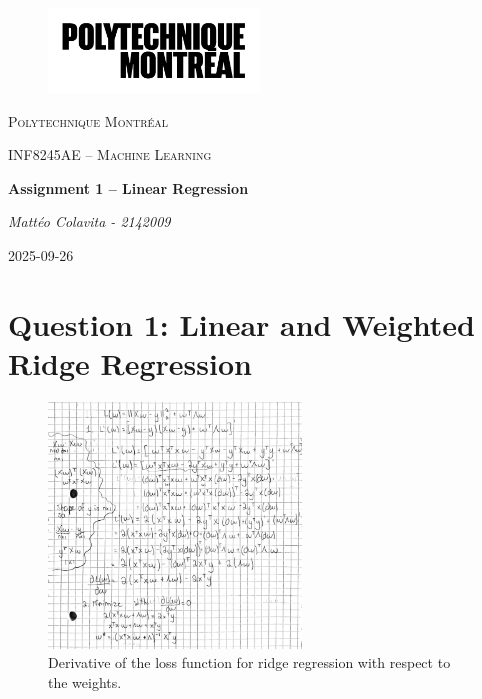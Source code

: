 \documentclass[11pt, a4paper]{article}
\begin{document}
\begin{titlepage}
    \centering
    \begin{figure}[h]
        \centering
        \includegraphics[width=0.5\textwidth]{./assets/logo_polymtl.png}
        \label{fig:logo_polymtl}
    \end{figure}

    {\scshape\LARGE Polytechnique Montréal \par}
    \vspace{1cm}
    {\scshape\Large INF8245AE – Machine Learning \par}
    \vspace{4cm}
    {\huge\bfseries Assignment 1 – Linear Regression\par}
    \vspace{2cm}
    {\Large\itshape Mattéo Colavita - 2142009\par}
    \vfill
    \vspace{0.8cm}
    {\large 2025-09-26\par}
\end{titlepage}

\section{Question 1: Linear and Weighted Ridge Regression}

\begin{figure}[H]
\centering
\includegraphics[width=0.6\textwidth]{./assets/derivative.png}
\caption{Derivative of the loss function for ridge regression with respect to the weights.}
\label{fig:derivative}
\end{figure}
\end{document}
